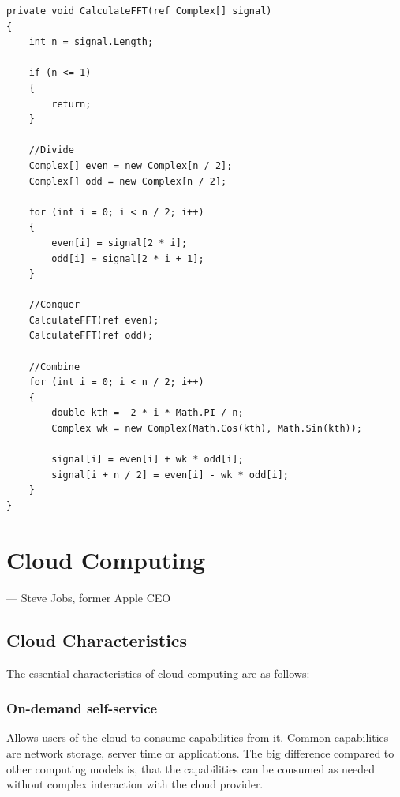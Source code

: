 \begin{lstlisting}[frame=single]
private void CalculateFFT(ref Complex[] signal)
{
	int n = signal.Length;

	if (n <= 1)
	{
		return;
	}

	//Divide
	Complex[] even = new Complex[n / 2];
	Complex[] odd = new Complex[n / 2];

	for (int i = 0; i < n / 2; i++)
	{
		even[i] = signal[2 * i];
		odd[i] = signal[2 * i + 1];
	}

	//Conquer
	CalculateFFT(ref even);
	CalculateFFT(ref odd);

	//Combine
	for (int i = 0; i < n / 2; i++)
	{
		double kth = -2 * i * Math.PI / n;
		Complex wk = new Complex(Math.Cos(kth), Math.Sin(kth));

		signal[i] = even[i] + wk * odd[i];
		signal[i + n / 2] = even[i] - wk * odd[i];
	}
}
\end{lstlisting}

\section{Cloud Computing}

\epigraph{}{--- \textup{Steve Jobs}, former Apple CEO}

\subsection{Cloud Characteristics}
The essential characteristics of cloud computing are as follows\cite{cloud_characteristics}\cite{nist}:

\subsubsection{On-demand self-service}
Allows users of the cloud to consume capabilities from it. Common capabilities are network storage, server time or applications. The big difference compared to other computing models is, that the capabilities can be consumed as needed without complex interaction with the cloud provider. 

